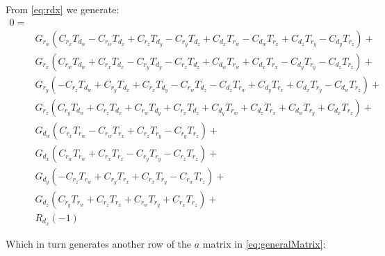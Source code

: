 \documentclass[12pt]{article}
\begin{document}
  From \autoref{eq:rdx} we generate:
  \begin{equation}
      \begin{split}
  0= \\&
  G_{r_w} (C_{r_x} T_{d_w}-C_{r_w} T_{d_x}+C_{r_z} T_{d_y}-C_{r_y} T_{d_z}+C_{d_x} T_{r_w}-C_{d_w} T_{r_x}+C_{d_z} T_{r_y}-C_{d_y} T_{r_z})+\\&
  G_{r_x} (C_{r_w} T_{d_w}+C_{r_x} T_{d_x}-C_{r_y} T_{d_y}-C_{r_z} T_{d_z}+C_{d_w} T_{r_w}+C_{d_x} T_{r_x}-C_{d_y} T_{r_y}-C_{d_z} T_{r_z})+\\&
  G_{r_y} (-C_{r_z} T_{d_w}+C_{r_y} T_{d_x}+C_{r_x} T_{d_y}-C_{r_w} T_{d_z}-C_{d_z} T_{r_w}+C_{d_y} T_{r_x}+C_{d_x} T_{r_y}-C_{d_w} T_{r_z})+\\&
  G_{r_z} (C_{r_y} T_{d_w}+C_{r_z} T_{d_x}+C_{r_w} T_{d_y}+C_{r_x} T_{d_z}+C_{d_y} T_{r_w}+C_{d_z} T_{r_x}+C_{d_w} T_{r_y}+C_{d_x} T_{r_z})+\\&
  G_{d_w} (C_{r_x} T_{r_w}-C_{r_w} T_{r_x}+C_{r_z} T_{r_y}-C_{r_y} T_{r_z})+\\&
  G_{d_x} (C_{r_w} T_{r_w}+C_{r_x} T_{r_x}-C_{r_y} T_{r_y}-C_{r_z} T_{r_z})+\\&
  G_{d_y} (-C_{r_z} T_{r_w}+C_{r_y} T_{r_x}+C_{r_x} T_{r_y}-C_{r_w} T_{r_z})+\\&
  G_{d_z} (C_{r_y} T_{r_w}+C_{r_z} T_{r_x}+C_{r_w} T_{r_y}+C_{r_x} T_{r_z})+\\&
   R_{d_x}(-1)
   \end{split}
   \end{equation}
   
   Which in turn generates another row of the $a$ matrix in \autoref{eq:generalMatrix}:
  
\end{document}
